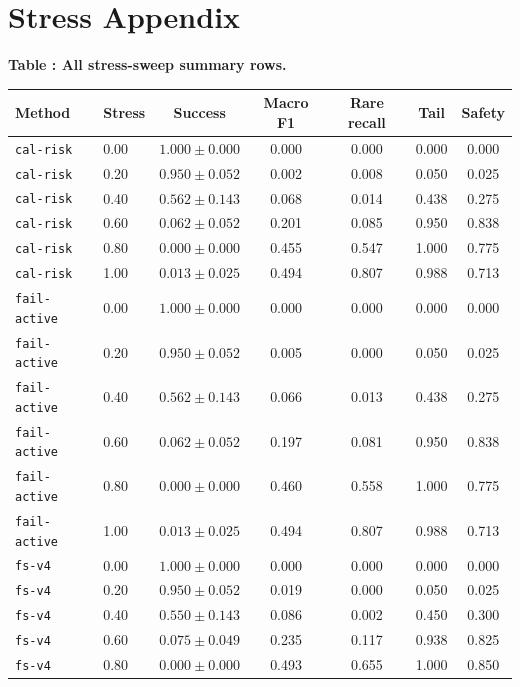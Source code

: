\documentclass{article}
\begin{document}
\section{Stress Appendix}
\tiny
\setlength{\tabcolsep}{2pt}
\begin{center}
\label{tab:stressall}\textbf{Table \thetable: All stress-sweep summary rows.}\\[0.4ex]
\begin{tabular}{llccccc}
\toprule
Method & Stress & Success & Macro F1 & Rare recall & Tail & Safety \\
\midrule
\texttt{cal-risk} & 0.00 & $1.000 \pm 0.000$ & 0.000 & 0.000 & 0.000 & 0.000 \\
\texttt{cal-risk} & 0.20 & $0.950 \pm 0.052$ & 0.002 & 0.008 & 0.050 & 0.025 \\
\texttt{cal-risk} & 0.40 & $0.562 \pm 0.143$ & 0.068 & 0.014 & 0.438 & 0.275 \\
\texttt{cal-risk} & 0.60 & $0.062 \pm 0.052$ & 0.201 & 0.085 & 0.950 & 0.838 \\
\texttt{cal-risk} & 0.80 & $0.000 \pm 0.000$ & 0.455 & 0.547 & 1.000 & 0.775 \\
\texttt{cal-risk} & 1.00 & $0.013 \pm 0.025$ & 0.494 & 0.807 & 0.988 & 0.713 \\
\texttt{fail-active} & 0.00 & $1.000 \pm 0.000$ & 0.000 & 0.000 & 0.000 & 0.000 \\
\texttt{fail-active} & 0.20 & $0.950 \pm 0.052$ & 0.005 & 0.000 & 0.050 & 0.025 \\
\texttt{fail-active} & 0.40 & $0.562 \pm 0.143$ & 0.066 & 0.013 & 0.438 & 0.275 \\
\texttt{fail-active} & 0.60 & $0.062 \pm 0.052$ & 0.197 & 0.081 & 0.950 & 0.838 \\
\texttt{fail-active} & 0.80 & $0.000 \pm 0.000$ & 0.460 & 0.558 & 1.000 & 0.775 \\
\texttt{fail-active} & 1.00 & $0.013 \pm 0.025$ & 0.494 & 0.807 & 0.988 & 0.713 \\
\texttt{fs-v4} & 0.00 & $1.000 \pm 0.000$ & 0.000 & 0.000 & 0.000 & 0.000 \\
\texttt{fs-v4} & 0.20 & $0.950 \pm 0.052$ & 0.019 & 0.000 & 0.050 & 0.025 \\
\texttt{fs-v4} & 0.40 & $0.550 \pm 0.143$ & 0.086 & 0.002 & 0.450 & 0.300 \\
\texttt{fs-v4} & 0.60 & $0.075 \pm 0.049$ & 0.235 & 0.117 & 0.938 & 0.825 \\
\texttt{fs-v4} & 0.80 & $0.000 \pm 0.000$ & 0.493 & 0.655 & 1.000 & 0.850 \\

\end{tabular}
\end{center}
\end{document}
